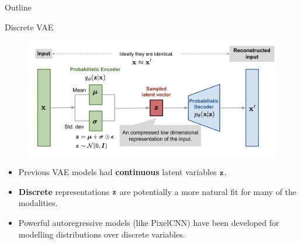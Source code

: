 

\begin{frame}
\titlepage
\end{frame}
\begin{frame}{Outline}
	\tableofcontents
\end{frame}
\begin{frame}{Discrete VAE}
	\begin{figure}[h]
		\centering
		\includegraphics[width=\linewidth]{figs/vae-gaussian.png}
	\end{figure}
	\begin{itemize}
		\item Previous VAE models had \textbf{continuous} latent variables $\mathbf{z}$.
		\item \textbf{Discrete} representations $\mathbf{z}$ are potentially a more natural fit for many of the modalities.
		\item Powerful autoregressive models (like PixelCNN) have been developed for modelling distributions over discrete variables.
	\end{itemize}
\end{frame}
